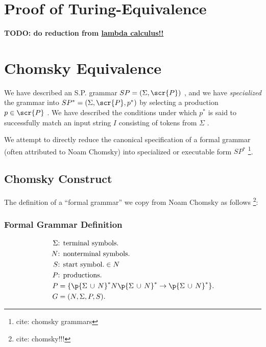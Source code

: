 \documentclass[10pt]{article}
\newcommand{\todocite}[1]{\footnote{cite: #1}}
\begin{document}
\section{Proof of Turing-Equivalence}
\label{sec:proof-of-turing-equivalence}

\textbf{TODO: do reduction from \href{https://en.wikipedia.org/wiki/Lambda_calculus}{lambda calculus!!}}

\section{Chomsky Equivalence}
\label{sec:chomsky-equivalence}
We have described an S.P. grammar $SP = (\Sigma, \scr{P})$ , and we have \textit{specialized} the grammar into $SP^* = (\Sigma, \scr{P}, p^*)$ by selecting a production $p \in \scr{P}$ . We have described the conditions under which $p^*$ is said to successfully match an input string $I$ consisting of tokens from $\Sigma$ .

We attempt to directly reduce the canonical specification of a formal grammar (often attributed to Noam Chomsky) into specialized or executable form $SP^*$ \todocite{chomsky grammars}.

\subsection{Chomsky Construct}
\label{sec:chomsky-construct}
The definition of a ``formal grammar'' we copy from Noam Chomsky as follows \todocite{chomsky!!!}:

\subsubsection{Formal Grammar Definition}
\label{sec:formal-grammar-definition}
\begin{align}
  \label{eq:chomsky-production}
  \Sigma &\text{: terminal symbols.} \\
  N &\text{: nonterminal symbols.} \\
  S &\text{: start symbol.} \in N \\
  P &\text{: productions.} \\
  P &= \{\p{\Sigma\, \cup \, N}^* N \p{\Sigma\, \cup \, N}^* \rightarrow \p{\Sigma\, \cup \, N}^* \}. \\
  G &= (N, \Sigma, P, S).
\end{align}
\end{document}
